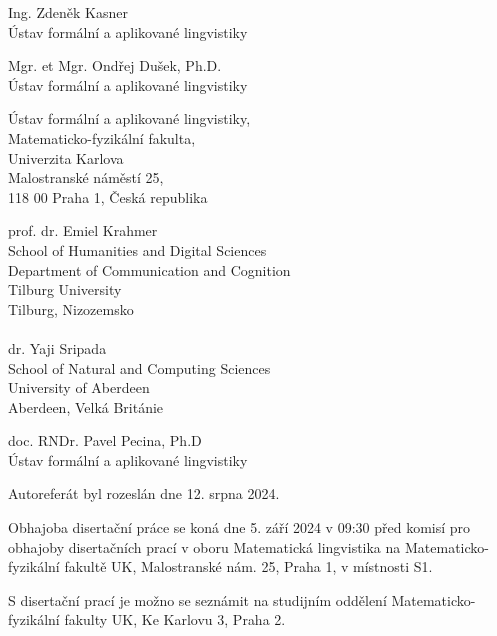 \documentclass[12pt,notitlepage,a4paper,oneside,openany]{report}
\begin{document}
\begin{description}[leftmargin=15.5em,labelwidth=15.5em,labelindent=0em,labelsep=0em]
    \item[Doktorand:] Ing. Zdeněk Kasner\\Ústav formální a aplikované lingvistiky
    \item[Školitel:] Mgr. et Mgr. Ondřej Dušek, Ph.D.\\Ústav formální a aplikované lingvistiky
    \item[Školicí pracoviště:]  Ústav formální a aplikované lingvistiky,
        \\Matematicko-fyzikální fakulta,
        \\Univerzita Karlova
        \\Malostranské náměstí 25,
        \\118 00 Praha 1, Česká republika

    \item[Oponenti:] prof. dr. Emiel Krahmer\\School of Humanities and Digital Sciences\\Department of Communication and Cognition\\Tilburg University\\Tilburg, Nizozemsko\\ \\ dr. Yaji Sripada\\ School of Natural and Computing Sciences\\University of Aberdeen\\Aberdeen, Velká Británie

    \item[Předseda RDSO:] doc. RNDr. Pavel Pecina, Ph.D\\Ústav formální a aplikované lingvistiky
\end{description}

\vfill

\noindent Autoreferát byl rozeslán dne 12. srpna 2024.

\vspace{0.5cm}

\noindent Obhajoba disertační práce se koná dne 5. září 2024 v 09:30 před komisí pro obhajoby disertačních prací v oboru Matematická lingvistika na Matematicko-fyzikální fakultě UK, Malostranské nám. 25, Praha 1, v místnosti S1.

\vspace{0.5cm}

\noindent S disertační prací je možno se seznámit na studijním oddělení Matematicko-fyzikální fakulty UK, Ke Karlovu 3, Praha 2.
\end{document}
